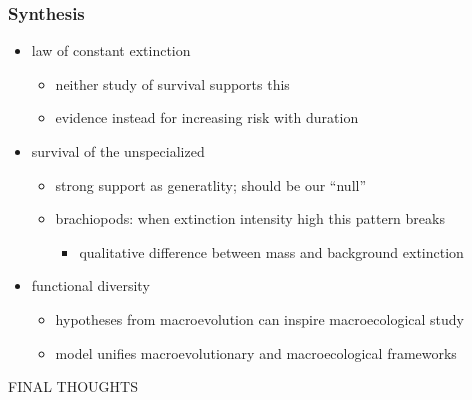 \documentclass{beamer}
\begin{document}
\begin{frame}
  \frametitle{Synthesis}

  \begin{itemize}
    \item<1-> \alert{law of constant extinction}
      \begin{itemize}
        \item neither study of survival supports this
        \item evidence instead for increasing risk with duration
      \end{itemize}
    \item<2-> \alert{survival of the unspecialized}
      \begin{itemize}
        \item strong support as generatlity; should be our ``null''
        \item brachiopods: when extinction intensity high this pattern breaks
          \begin{itemize}
            \item qualitative difference between mass and background extinction
          \end{itemize}
      \end{itemize}
    \item<3-> \alert{functional diversity}
      \begin{itemize}
        \item hypotheses from macroevolution can inspire macroecological study
        \item model unifies macroevolutionary and macroecological frameworks
      \end{itemize}
  \end{itemize}
\end{frame}


\begin{frame}
  \begin{center}
    \huge{\uppercase{final thoughts}}
  \end{center}
\end{frame}
\end{document}
